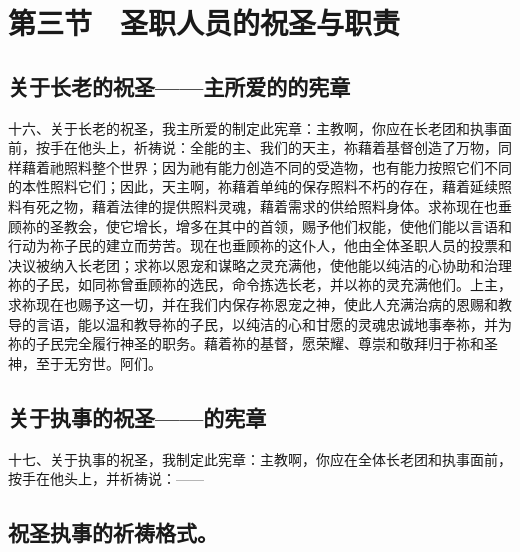 
\section{第三节　圣职人员的祝圣与职责}


\subsection{关于长老的祝圣——主所爱的的宪章}

十六、关于长老的祝圣，我主所爱的制定此宪章：主教啊，你应在长老团和执事面前，按手在他头上，祈祷说：全能的主、我们的天主，祢藉着基督创造了万物，同样藉着祂照料整个世界；因为祂有能力创造不同的受造物，也有能力按照它们不同的本性照料它们；因此，天主啊，祢藉着单纯的保存照料不朽的存在，藉着延续照料有死之物，藉着法律的提供照料灵魂，藉着需求的供给照料身体。求祢现在也垂顾祢的圣教会，使它增长，增多在其中的首领，赐予他们权能，使他们能以言语和行动为祢子民的建立而劳苦。现在也垂顾祢的这仆人，他由全体圣职人员的投票和决议被纳入长老团；求祢以恩宠和谋略之灵充满他，使他能以纯洁的心协助和治理祢的子民，如同祢曾垂顾祢的选民，命令拣选长老，并以祢的灵充满他们。上主，求祢现在也赐予这一切，并在我们内保存祢恩宠之神，使此人充满治病的恩赐和教导的言语，能以温和教导祢的子民，以纯洁的心和甘愿的灵魂忠诚地事奉祢，并为祢的子民完全履行神圣的职务。藉着祢的基督，愿荣耀、尊崇和敬拜归于祢和圣神，至于无穷世。阿们。\par


\subsection{关于执事的祝圣——的宪章}

十七、关于执事的祝圣，我制定此宪章：主教啊，你应在全体长老团和执事面前，按手在他头上，并祈祷说：——\par


\subsection{祝圣执事的祈祷格式。}

